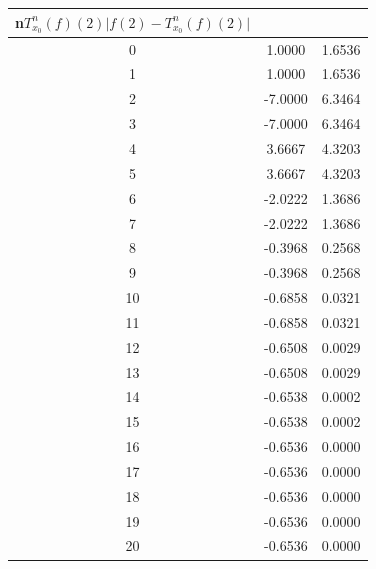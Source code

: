 \documentclass{article}
\providecommand{\abs}[1]{\lvert#1\rvert}
\begin{document}
\begin{tabular}{|c|c|c|}
\hline
{n}{$T_{x_0}^n (f)(2)$}{$\abs{f(2)-T_{x_0}^n (f)(2)}$} \\
\hline
 0 & 1.0000 & 1.6536 \\ 
  1 & 1.0000 & 1.6536 \\ 
  2 & -7.0000 & 6.3464 \\ 
  3 & -7.0000 & 6.3464 \\ 
  4 & 3.6667 & 4.3203 \\ 
  5 & 3.6667 & 4.3203 \\ 
  6 & -2.0222 & 1.3686 \\ 
  7 & -2.0222 & 1.3686 \\ 
  8 & -0.3968 & 0.2568 \\ 
  9 & -0.3968 & 0.2568 \\ 
 10 & -0.6858 & 0.0321 \\ 
 11 & -0.6858 & 0.0321 \\ 
 12 & -0.6508 & 0.0029 \\ 
 13 & -0.6508 & 0.0029 \\ 
 14 & -0.6538 & 0.0002 \\ 
 15 & -0.6538 & 0.0002 \\ 
 16 & -0.6536 & 0.0000 \\ 
 17 & -0.6536 & 0.0000 \\ 
 18 & -0.6536 & 0.0000 \\ 
 19 & -0.6536 & 0.0000 \\ 
 20 & -0.6536 & 0.0000 \\ 
 \hline 
\end{tabular}
\end{document}

